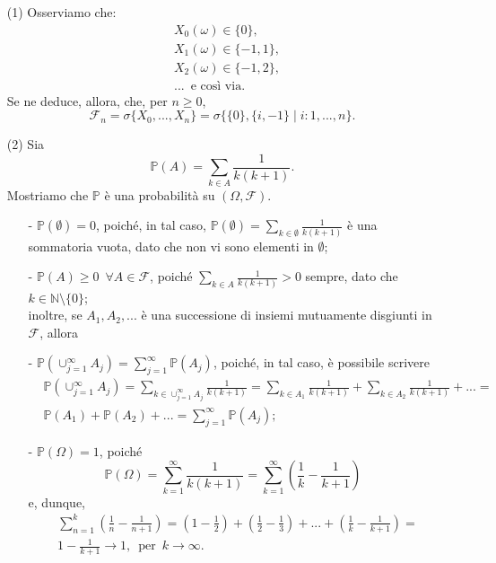 \documentclass[11pt,largemargins]{homework}
\begin{document}
  \begin{enumerate}
  \item[(1)]
  Osserviamo che:
  \begin{align*}
  &X_{0}\left(\omega\right)\in\{0\},\\
  &X_{1}\left(\omega\right)\in\{-1,1\},\\
  &X_{2}\left(\omega\right)\in\{-1,2\},\\
  &...\,\,\,\text{e così via}.
  \end{align*}
  Se ne deduce, allora, che, per $n\geq 0$,
  \begin{equation*}
  \mathcal{F}_{n}=\sigma\{X_{0},...,X_{n}\}=\sigma\{\{0\},\{i,-1\} \mid i:1,...,n\}.
  \end{equation*}
  \item[(2)]
  Sia
  \begin{equation*}
  \mathbb{P}\left(A\right)=\sum_{k\in A}\frac{1}{k\left(k+1\right)}.
  \end{equation*}
  Mostriamo che $\mathbb{P}$ è una probabilità su $\left(\Omega,\mathcal{F}\right)$.
  \begin{itemize}
  \item[-]
  $\mathbb{P}\left(\emptyset\right)=0$, poiché, in tal caso, $\mathbb{P}\left(\emptyset\right)=\sum_{k\in \emptyset}\frac{1}{k\left(k+1\right)}$ è una sommatoria vuota, dato che non vi sono elementi in $\emptyset$;
  \item[-]
  $\mathbb{P}\left(A\right)\geq 0 \,\,\,\forall A\in \mathcal{F}$, poiché $\sum_{k\in A}\frac{1}{k\left(k+1\right)}> 0$ sempre, dato che $k \in \mathbb{N}\setminus\{0\}$;\\
  inoltre, se $A_{1},A_{2},...$ è una successione di insiemi mutuamente disgiunti in $\mathcal{F}$, allora 
  \item[-]
  $\mathbb{P}\left(\cup_{j=1}^{\infty}A_{j}\right)=\sum_{j=1}^{\infty}\mathbb{P}\left(A_{j}\right)$, poiché, in tal caso, è possibile scrivere
  \begin{align*}
  &\mathbb{P}\left(\cup_{j=1}^{\infty}A_{j}\right)=\sum_{k\in\cup_{j=1}^{\infty}A_{j}}\frac{1}{k\left(k+1\right)}=\sum_{k\in A_{1}}\frac{1}{k\left(k+1\right)}+\sum_{k\in A_{2}}\frac{1}{k\left(k+1\right)}+...=\\
  &\mathbb{P}\left(A_{1}\right)+\mathbb{P}\left(A_{2}\right)+...=\sum_{j=1}^{\infty}\mathbb{P}\left(A_{j}\right);
\end{align*}   
\item[-]
$\mathbb{P}\left(\Omega\right)=1$, poiché
\begin{equation*}
\mathbb{P}\left(\Omega\right)=\sum_{k=1}^{\infty}\frac{1}{k\left(k+1\right)}=\sum_{k=1}^{\infty}\left(\frac{1}{k}-\frac{1}{k+1}\right)
\end{equation*}
e, dunque,
\begin{align*}
&\sum_{n=1}^{k}\left(\frac{1}{n}-\frac{1}{n+1}\right)=\left(1-\frac{1}{2}\right)+\left(\frac{1}{2}-\frac{1}{3}\right)+...+\left(\frac{1}{k}-\frac{1}{k+1}\right)=\\
&1-\frac{1}{k+1}\longrightarrow 1, \,\,\, \text{per}\,\,\, k\rightarrow \infty.
\end{align*}
 \end{itemize}
 

\end{enumerate}
\end{document}
